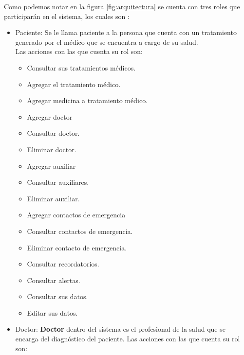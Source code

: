 Como podemos notar en la figura \ref{fig:arquitectura} se cuenta con tres roles que participarán en el sistema, los cuales son :
\begin{itemize}

	\item Paciente: Se le llama paciente a la persona que cuenta con un tratamiento generado por el médico que se encuentra a cargo de su salud.\\
	
	Las acciones con las que cuenta su rol son:
	\begin{itemize}
		\item Consultar sus tratamientos médicos.
		\item Agregar el tratamiento médico.
		\item Agregar medicina a tratamiento médico.
		\item Agregar doctor
		\item Consultar doctor.
		\item Eliminar doctor.
		\item Agregar auxiliar
		\item Consultar auxiliares.
		\item Eliminar auxiliar.
		\item Agregar contactos de emergencia
		\item Consultar contactos de emergencia.
		\item Eliminar contacto de emergencia.
		\item Consultar recordatorios.
		\item Consultar alertas.
		\item Consultar sus datos.
		\item Editar sus datos.
	\end{itemize}

	\item Doctor: \textbf{Doctor} dentro del sistema es el profesional de la salud que se encarga del diagnóstico del paciente.
	Las acciones con las que cuenta su rol son:
		\begin{itemize}
			

\end{itemize}
\end{itemize}

